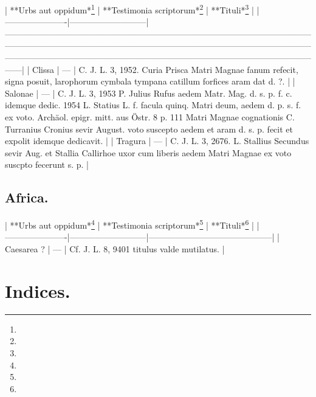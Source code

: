 \documentclass[a4paper, 11pt, oneside, polutonikogreek, german]{article}
\begin{document}
| **Urbs aut oppidum*\footnote{} | **Testimonia scriptorum*\footnote{} | **Tituli*\footnote{}                                                                                                                                                                                                                                                                                                                               |
|----------------------|---------------------------|------------------------------------------------------------------------------------------------------------------------------------------------------------------------------------------------------------------------------------------------------------------------------------------------------------------------------------------|
| Clissa               | ---                       | C. J. L. 3, 1952. Curia Prisca Matri Magnae fanum refecit, signa posuit, larophorum cymbala tympana catillum forfices aram dat d. ?.                                                                                                                                                                                                     |
| Salonae              | ---                       | C. J. L. 3, 1953 P. Julius Rufus aedem Matr. Mag. d. s. p. f. c. idemque dedic. 1954 L. Statius L. f. facula quinq. Matri deum, aedem d. p. s. f. ex voto. Archäol. epigr. mitt. aus Östr. 8 p. 111 Matri Magnae cognationis C. Turranius Cronius sevir August. voto suscepto aedem et aram d. s. p. fecit et expolit idemque dedicavit. |
| Tragura              | ---                       | C. J. L. 3, 2676. L. Stallius Secundus sevir Aug. et Stallia Callirhoe uxor cum liberis aedem Matri Magnae ex voto suscpto fecerunt s. p.                                                                                                                                                                                                |

\subsection{Africa.}

| **Urbs aut oppidum*\footnote{} | **Testimonia scriptorum*\footnote{} | **Tituli*\footnote{}                                 |
|----------------------|---------------------------|--------------------------------------------|
| Caesarea ?           | ---                       | Cf. J. L. 8, 9401 titulus valde mutilatus. |
\clearpage
\section{Indices.}
\end{document}
